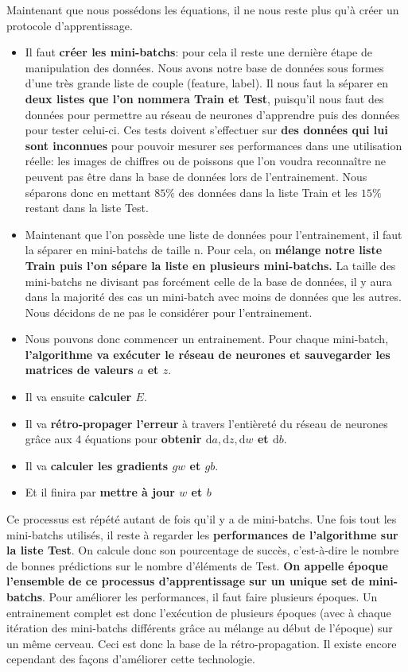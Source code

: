 \documentclass[12pt,a4paper]{extarticle}
\newcommand{\ud}{\mathrm{d}}
\begin{document}
Maintenant que nous possédons les équations, il ne nous reste plus qu'à créer un protocole d'apprentissage.
\begin{itemize}
\item Il faut \textbf{créer les mini-batchs}: pour cela il reste une dernière étape de manipulation des données. Nous avons notre base de données sous formes d'une très grande liste de couple (feature, label). Il nous faut la séparer en \textbf{deux listes que l'on nommera Train et Test}, puisqu'il nous faut des données pour permettre au réseau de neurones d'apprendre puis des données pour tester celui-ci. Ces tests doivent s'effectuer sur \textbf{des données qui lui sont inconnues} pour pouvoir mesurer ses performances dans une utilisation réelle: les images de chiffres ou de poissons que l'on voudra reconnaître ne peuvent pas être dans la base de données lors de l'entrainement. Nous séparons donc en mettant $85\%$ des données dans la liste Train et les $15\%$ restant dans la liste Test.
\item Maintenant que l'on possède une liste de données pour l'entrainement, il faut la séparer en mini-batchs de taille n. Pour cela, on \textbf{mélange notre liste Train puis l'on sépare la liste en plusieurs mini-batchs.} La taille des mini-batchs ne divisant pas forcément celle de la base de données, il y aura dans la majorité des cas un mini-batch avec moins de données que les autres. Nous décidons de ne pas le considérer pour l'entrainement.

\item Nous pouvons donc commencer un entrainement. Pour chaque mini-batch, \textbf{l'algorithme va exécuter le réseau de neurones et sauvegarder les matrices de valeurs $a$ et $z$}. 
\item Il va ensuite \textbf{calculer $E$}.
\item Il va \textbf{rétro-propager l'erreur} à travers l'entièreté du réseau de neurones grâce aux 4 équations pour \textbf{obtenir $\ud a,\ud z,\ud w$ et $\ud b$}.
\item Il va \textbf{calculer les gradients $gw$ et $gb$}.
\item Et il finira par \textbf{mettre à jour $w$ et $b$}
\end{itemize}

Ce processus est répété autant de fois qu'il y a de mini-batchs. Une fois tout les mini-batchs utilisés, il reste à regarder les \textbf{performances de l'algorithme sur la liste Test}. On calcule donc son pourcentage de succès, c'est-à-dire le nombre de bonnes prédictions sur le nombre d'éléments de Test. \textbf{On appelle époque l'ensemble de ce processus d'apprentissage sur un unique set de mini-batchs}. Pour améliorer les performances, il faut faire plusieurs époques. Un entrainement complet est donc l'exécution de plusieurs époques (avec à chaque itération des mini-batchs différents grâce au mélange au début de l'époque) sur un même cerveau. Ceci est donc la base de la rétro-propagation. Il existe encore cependant des façons d'améliorer cette technologie. 
\end{document}
